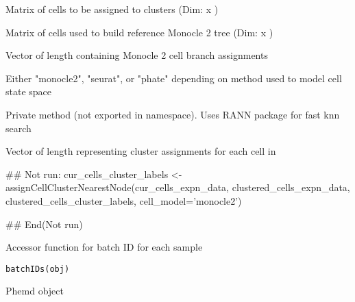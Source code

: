 \documentclass[a4paper]{book}
\begin{document}
%
\begin{Arguments}
\begin{ldescription}
\item[\code{cur\_cells}] Matrix of cells to be assigned to clusters (Dim:  x )

\item[\code{ref\_cells}] Matrix of cells used to build reference Monocle 2 tree (Dim:  x )

\item[\code{ref\_cell\_labels}] Vector of length  containing Monocle 2 cell branch assignments

\item[\code{cell\_model}] Either "monocle2", "seurat", or "phate" depending on method used to model cell state space
\end{ldescription}
\end{Arguments}
%
\begin{Details}\relax
Private method (not exported in namespace). Uses RANN package for fast knn search
\end{Details}
%
\begin{Value}
Vector of length  representing cluster assignments for each cell in 
\end{Value}
%
\begin{Examples}
\begin{ExampleCode}
## Not run: 
cur_cells_cluster_labels <- assignCellClusterNearestNode(cur_cells_expn_data,
clustered_cells_expn_data, clustered_cells_cluster_labels, cell_model='monocle2')

## End(Not run)
\end{ExampleCode}
\end{Examples}
%
\begin{Description}\relax
Accessor function for batch ID for each sample
\end{Description}
%
\begin{Usage}
\begin{verbatim}
batchIDs(obj)
\end{verbatim}
\end{Usage}
%
\begin{Arguments}
\begin{ldescription}
\item[\code{obj}] Phemd object
\end{ldescription}
\end{Arguments}
\end{document}
